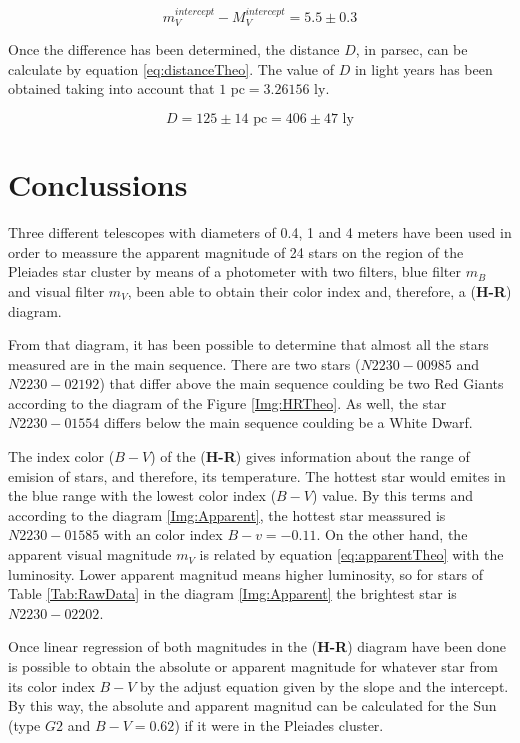 \documentclass[twoside]{article}
\begin{document}
\begin{multicols}{2}
				\begin{equation}
					m_V^{intercept} - M_V^{intercept} = 5.5 \pm 0.3 
				\end{equation}

			Once the difference has been determined, the distance $D$, in parsec, can be calculate by equation \ref{eq:distanceTheo}. The value of $D$ in light years has been obtained taking into account that $1 \textrm{ pc} = 3.26156 \textrm{ ly}$.

				\begin{equation}
					D = 125 \pm 14 \textrm{ pc} = 406 \pm 47 \textrm{ ly}
				\end{equation}

		\section{Conclussions}

			Three different telescopes with diameters of 0.4, 1 and 4 meters have been used in order to meassure the apparent magnitude of 24 stars on the region of the Pleiades star cluster by means of a photometer with two filters,  blue filter $m_B$ and visual filter $m_V$, been able to obtain their color index and, therefore, a (\textbf{H-R}) diagram.

			From that diagram, it has been possible to determine that almost all the stars measured are in the main sequence. There are two stars ($N2230-00985$ and $N2230-02192$) that differ above the main sequence coulding be two Red Giants according to the diagram of the Figure \ref{Img:HRTheo}. As well, the star $N2230-01554$ differs below the main sequence coulding be a White Dwarf. 

			The index color ($B-V$) of the (\textbf{H-R}) gives information about the range of emision of stars, and therefore, its temperature. The hottest star would emites in the blue range with the lowest color index ($B-V$) value. By this terms and according to the diagram \ref{Img:Apparent}, the hottest star meassured is $N2230-01585$ with an color index $B-v = -0.11$. On the other hand, the apparent visual magnitude $m_V$ is related by equation \ref{eq:apparentTheo} with the luminosity. Lower apparent magnitud means higher luminosity, so for stars of Table \ref{Tab:RawData} in the diagram \ref{Img:Apparent} the brightest star is $N2230-02202$.

			Once linear regression of both magnitudes in the (\textbf{H-R}) diagram have been done is possible to obtain the absolute or apparent magnitude for whatever star from its color index $B-V$ by the adjust equation given by the slope and the intercept. By this way, the absolute and apparent magnitud can be calculated for the Sun (type $G2$ and $B-V = 0.62$) if it were in the Pleiades cluster.


\end{multicols}
\end{document}
